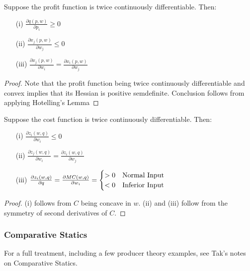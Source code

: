 \documentclass[12pt]{article}
\begin{document}
\begin{proposition}
	Suppose the profit function is twice continuously differentiable. Then:
	\begin{itemize}
		\item[(i)] $\frac{\partial q(p,w)}{\partial p_i} \ge 0$
		
		\item[(ii)] $\frac{\partial x_j(p,w)}{\partial w_j} \le 0$
		
		\item[(iii)] $\frac{\partial x_j(p,w)}{\partial w_i} = \frac{\partial x_i(p,w)}{\partial w_j}$
	\end{itemize}
\end{proposition}
\begin{proof}
	Note that the profit function being twice continuously differentiable and convex implies that its Hessian is positive semdefinite. Conclusion follows from applying Hotelling's Lemma
\end{proof}

\begin{proposition}
	Suppose the cost function is twice continuously differentiable. Then:
	\begin{itemize}
		\item[(i)] $\frac{\partial z_i(w,q)}{\partial w_i} \le 0$
		
		\item[(ii)] $\frac{\partial z_j(w,q)}{\partial w_i} = \frac{\partial z_i(w,q)}{\partial w_j}$
		
		\item[(iii)] $\frac{\partial z_i(w,q)}{\partial q} = \frac{\partial MC(w,q)}{\partial w_i} = \begin{cases} > 0 & \textnormal{Normal Input} \\ < 0 & \textnormal{Inferior Input} \end{cases}$
	\end{itemize}
\end{proposition}
\begin{proof}
	(i) follows from $C$ being concave in $w$. (ii) and (iii) follow from the symmetry of second derivatives of $C$.
\end{proof}

\subsubsection{Comparative Statics}

\begin{remark}
	For a full treatment, including a few producer theory examples, see Tak's notes on Comparative Statics.
\end{remark}
\end{document}
